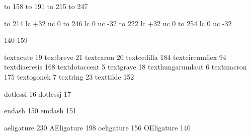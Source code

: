 

\startmapping[texnansi]

 to 158
 to 191
 to 215
 to 247

 to 214 lc +32 uc   0
 to 246 lc   0 uc -32
 to 222 lc +32 uc   0
 to 254 lc   0 uc -32

 140
 159



\stopmapping

\startencoding[texnansi]

 textacute         19
 textbreve         21
 textcaron         20
 textcedilla      184
 textcircumflex    94 %
 textdiaeresis    168
 textdotaccent      5
 textgrave         18
 texthungarumlaut   6
 textmacron       175
 textogonek         7
 textring          23
 texttilde        152

 dotlessi          16 %
 dotlessj          17

 endash           150 %
 emdash           151 %

 aeligature       230
 AEligature       198
 oeligature       156
 OEligature       140

